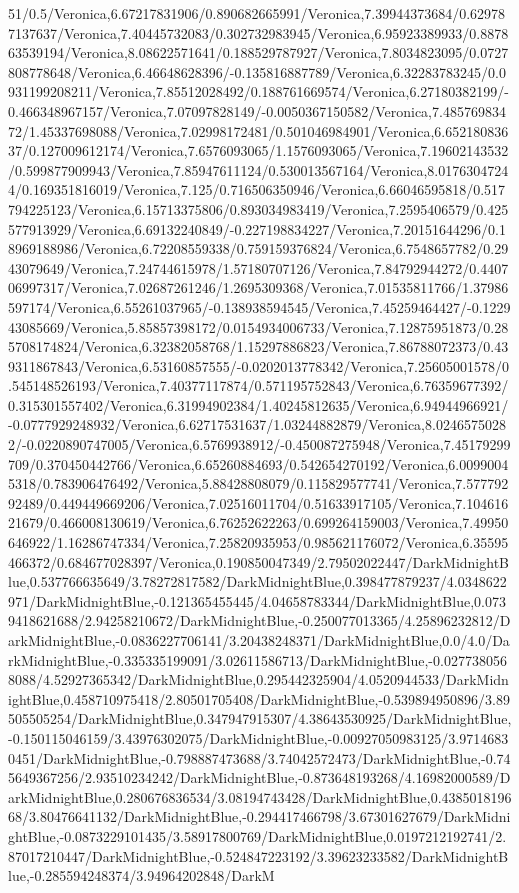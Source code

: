 {\begin{tikzternal}
51/0.5/Veronica,6.67217831906/0.890682665991/Veronica,7.39944373684/0.629787137637/Veronica,7.40445732083/0.302732983945/Veronica,6.95923389933/0.887863539194/Veronica,8.08622571641/0.188529787927/Veronica,7.8034823095/0.0727808778648/Veronica,6.46648628396/-0.135816887789/Veronica,6.32283783245/0.0931199208211/Veronica,7.85512028492/0.188761669574/Veronica,6.27180382199/-0.466348967157/Veronica,7.07097828149/-0.0050367150582/Veronica,7.48576983472/1.45337698088/Veronica,7.02998172481/0.501046984901/Veronica,6.65218083637/0.127009612174/Veronica,7.6576093065/1.1576093065/Veronica,7.19602143532/0.599877909943/Veronica,7.85947611124/0.530013567164/Veronica,8.01763047244/0.169351816019/Veronica,7.125/0.716506350946/Veronica,6.66046595818/0.517794225123/Veronica,6.15713375806/0.893034983419/Veronica,7.2595406579/0.425577913929/Veronica,6.69132240849/-0.227198834227/Veronica,7.20151644296/0.18969188986/Veronica,6.72208559338/0.759159376824/Veronica,6.7548657782/0.2943079649/Veronica,7.24744615978/1.57180707126/Veronica,7.84792944272/0.440706997317/Veronica,7.02687261246/1.2695309368/Veronica,7.01535811766/1.37986597174/Veronica,6.55261037965/-0.138938594545/Veronica,7.45259464427/-0.122943085669/Veronica,5.85857398172/0.0154934006733/Veronica,7.12875951873/0.285708174824/Veronica,6.32382058768/1.15297886823/Veronica,7.86788072373/0.439311867843/Veronica,6.53160857555/-0.0202013778342/Veronica,7.25605001578/0.545148526193/Veronica,7.40377117874/0.571195752843/Veronica,6.76359677392/0.315301557402/Veronica,6.31994902384/1.40245812635/Veronica,6.94944966921/-0.0777929248932/Veronica,6.62717531637/1.03244882879/Veronica,8.02465750282/-0.0220890747005/Veronica,6.5769938912/-0.450087275948/Veronica,7.45179299709/0.370450442766/Veronica,6.65260884693/0.542654270192/Veronica,6.00990045318/0.783906476492/Veronica,5.88428808079/0.115829577741/Veronica,7.57779292489/0.449449669206/Veronica,7.02516011704/0.51633917105/Veronica,7.10461621679/0.466008130619/Veronica,6.76252622263/0.699264159003/Veronica,7.49950646922/1.16286747334/Veronica,7.25820935953/0.985621176072/Veronica,6.35595466372/0.684677028397/Veronica,0.190850047349/2.79502022447/DarkMidnightBlue,0.537766635649/3.78272817582/DarkMidnightBlue,0.398477879237/4.0348622971/DarkMidnightBlue,-0.121365455445/4.04658783344/DarkMidnightBlue,0.0739418621688/2.94258210672/DarkMidnightBlue,-0.250077013365/4.25896232812/DarkMidnightBlue,-0.0836227706141/3.20438248371/DarkMidnightBlue,0.0/4.0/DarkMidnightBlue,-0.335335199091/3.02611586713/DarkMidnightBlue,-0.0277380568088/4.52927365342/DarkMidnightBlue,0.295442325904/4.0520944533/DarkMidnightBlue,0.458710975418/2.80501705408/DarkMidnightBlue,-0.539894950896/3.89505505254/DarkMidnightBlue,0.347947915307/4.38643530925/DarkMidnightBlue,-0.150115046159/3.43976302075/DarkMidnightBlue,-0.00927050983125/3.97146830451/DarkMidnightBlue,-0.798887473688/3.74042572473/DarkMidnightBlue,-0.745649367256/2.93510234242/DarkMidnightBlue,-0.873648193268/4.16982000589/DarkMidnightBlue,0.280676836534/3.08194743428/DarkMidnightBlue,0.438501819668/3.80476641132/DarkMidnightBlue,-0.294417466798/3.67301627679/DarkMidnightBlue,-0.0873229101435/3.58917800769/DarkMidnightBlue,0.0197212192741/2.87017210447/DarkMidnightBlue,-0.524847223192/3.39623233582/DarkMidnightBlue,-0.285594248374/3.94964202848/DarkM
\end{tikzternal}}
